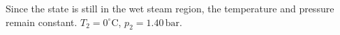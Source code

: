 Since the state is still in the wet steam region, the temperature and pressure remain constant. \( T_2 = 0^\circ \text{C} \), \( p_2 = 1.40 \, \text{bar} \).
